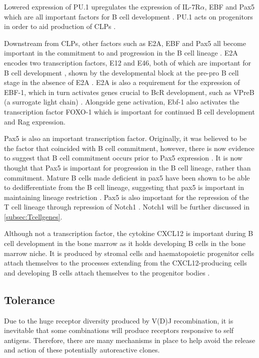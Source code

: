 Lowered expression of PU.1 upregulates the expression of IL-7R$\alpha$, EBF and Pax5 which are all important factors for B cell development \citep{Hagman2006}.
PU.1 acts on progenitors in order to aid production of CLPs \citep{Hagman2006}.

Downstream from CLPs, other factors such as E2A, EBF and Pax5 all become important in the commitment to and progression in the B cell lineage \citep{Mansson2008}.
E2A encodes two transcription factors, E12 and E46, both of which are important for B cell development \citep{Bain1997}, shown by the developmental block at the pre-pro B cell stage in the absence of E2A \citep{Bain1994}.
E2A is also a requirement for the expression of EBF-1, which in turn activates genes crucial to BcR development, such as VPreB (a surrogate light chain) \citep{Welinder2011}.
Alongside gene activation, Ebf-1 also activates the transcription factor FOXO-1 which is important for continued B cell development and Rag expression\citep{Amin2008}.

Pax5 is also an important transcription factor.
Originally, it was believed to be the factor that coincided with B cell commitment, however, there is now evidence to suggest that B cell commitment occurs prior to Pax5 expression \citep{Mansson2008}.
It is now thought that Pax5 is important for progression in the B cell lineage, rather than commitment.
Mature B cells made deficient in pax5 have been shown to be able to dedifferentiate from the B cell lineage, suggesting that pax5 is important in maintaining lineage restriction \citep{Cobaleda2007}.
Pax5 is also important for the repression of the T cell lineage through repression of Notch1 \citep{Souabni2002}.
Notch1 will be further discussed in \cref{subsec:Tcellgenes}.

Although not a transcription factor, the cytokine CXCL12 is important during B cell development in the bone marrow as it holds developing B cells in the bone marrow niche.
It is produced by stromal cells and haematopoietic progenitor cells attach themselves to the processes extending from the CXCL12-producing cells and developing B cells attach themselves to the progenitor bodies \citep{Tokoyoda2004}.

\subsection{Tolerance}

Due to the huge receptor diversity produced by V(D)J recombination, it is inevitable that some combinations will produce receptors responsive to self antigens.
Therefore, there are many mechanisms in place to help avoid the release and action of these potentially autoreactive clones.

